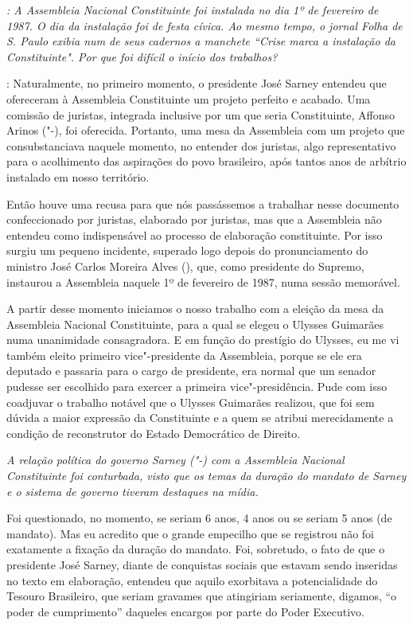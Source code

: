 \emph{: A Assembleia Nacional Constituinte foi instalada no dia 1º de
fevereiro de 1987. O dia da instalação foi de festa cívica. Ao mesmo
tempo, o jornal \emph{Folha de S. Paulo} exibia num de seus cadernos a manchete
``Crise marca a instalação da Constituinte". Por que foi difícil o
início dos trabalhos?}

: Naturalmente, no primeiro momento, o presidente José
Sarney entendeu que ofereceram à Assembleia Constituinte um projeto
perfeito e acabado. Uma comissão de juristas, integrada inclusive por um
que seria Constituinte, Affonso Arinos ("-), foi oferecida.
Portanto, uma mesa da Assembleia com um projeto que consubstanciava
naquele momento, no entender dos juristas, algo representativo para o
acolhimento das aspirações do povo brasileiro, após tantos anos de
arbítrio instalado em nosso território.

Então houve uma recusa para que nós passássemos a trabalhar nesse
documento confeccionado por juristas, elaborado por juristas, mas que a
Assembleia não entendeu como indispensável ao processo de elaboração
constituinte. Por isso surgiu um pequeno incidente, superado logo depois
do pronunciamento do ministro José Carlos Moreira Alves (), que, como
presidente do Supremo, instaurou a Assembleia naquele 1º de fevereiro de
1987, numa sessão memorável.

A partir desse momento iniciamos o nosso trabalho com a eleição da mesa
da Assembleia Nacional Constituinte, para a qual se elegeu o Ulysses
Guimarães numa unanimidade consagradora. E em função do prestígio do
Ulysses, eu me vi também eleito primeiro vice"-presidente da Assembleia,
porque se ele era deputado e passaria para o cargo de presidente, era
normal que um senador pudesse ser escolhido para exercer a primeira
vice"-presidência. Pude com isso coadjuvar o trabalho notável que o
Ulysses Guimarães realizou, que foi sem dúvida a maior expressão da
Constituinte e a quem se atribui merecidamente a condição de
reconstrutor do Estado Democrático de Direito.

\medskip

\noindent\emph{A relação política do governo Sarney ("-) com a Assembleia
Nacional Constituinte foi conturbada, visto que os temas da duração do
mandato de Sarney e o sistema de governo tiveram destaques na mídia.}

Foi questionado, no momento, se seriam 6 anos, 4
anos ou se seriam 5 anos (de mandato). Mas eu acredito que o grande
empecilho que se registrou não foi exatamente a fixação da duração do
mandato. Foi, sobretudo, o fato de que o presidente José Sarney, diante
de conquistas sociais que estavam sendo inseridas no texto em
elaboração, entendeu que aquilo exorbitava a potencialidade do Tesouro
Brasileiro, que seriam gravames que atingiriam seriamente, digamos, ``o
poder de cumprimento'' daqueles encargos por parte do Poder Executivo.

